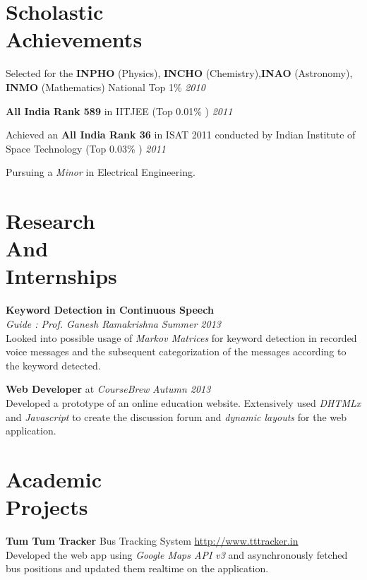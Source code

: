 \documentclass[margin,10pt]{resume}
\begin{document}
\begin{resume}

\vspace{15mm}

\section{\mysidestyle Scholastic\\Achievements}

\begin{list2}
\item Selected for the \textbf{INPHO} (Physics), \textbf{INCHO} (Chemistry),\textbf{INAO} (Astronomy), \textbf{ INMO} (Mathematics) National Top 1\% \hfill \emph{2010}
\item \textbf{All India Rank 589} in IITJEE (Top 0.01\% ) \hfill \emph{2011}
\item Achieved an \textbf{All India Rank 36} in ISAT 2011 conducted by Indian Institute of Space Technology (Top 0.03\% )
\hfill \emph{2011}
\item Pursuing a \emph{Minor} in Electrical Engineering.
\end{list2}
\section{\mysidestyle Research\\And\\Internships }
\textbf{Keyword Detection in Continuous Speech} \\
    \textsl{Guide : Prof. Ganesh Ramakrishna} \hfill \emph{Summer 2013} \\
     Looked into possible usage of \emph{Markov Matrices} for keyword detection in recorded voice messages and the subsequent categorization of the messages according to the keyword detected.

\textbf{Web Developer} at \emph{CourseBrew} \hfill \emph{Autumn 2013} \\
Developed a prototype of an online education website. Extensively used \emph{DHTMLx} and \emph{Javascript} to create the discussion forum and \emph{dynamic layouts} for the web application.

\section{\mysidestyle Academic\\Projects}

\textbf{Tum Tum Tracker} \hfill Bus Tracking System \hfill
    \url{http://www.tttracker.in} \\
 Developed the web app using \emph{Google Maps API v3} and asynchronously fetched bus positions and updated them realtime  on the application.


\end{resume}
\end{document}
